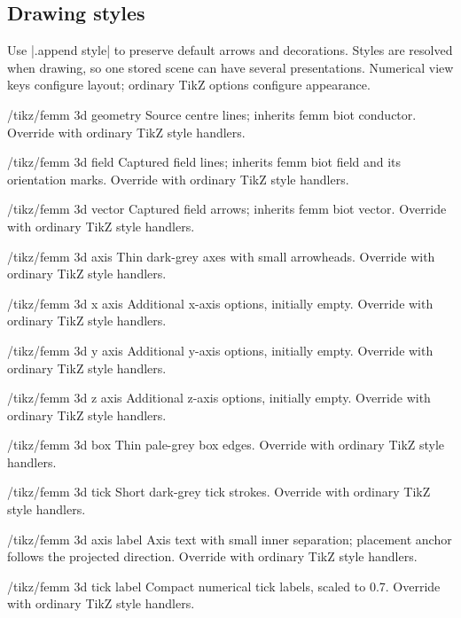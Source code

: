 \subsection{Drawing styles}
Use |.append style| to preserve default arrows and decorations. Styles are
resolved when drawing, so one stored scene can have several presentations.
Numerical view keys configure layout; ordinary TikZ options configure appearance.
\begin{key}{/tikz/femm 3d geometry}
Source centre lines; inherits femm biot conductor. Override with ordinary TikZ style handlers.
\end{key}
\begin{key}{/tikz/femm 3d field}
Captured field lines; inherits femm biot field and its orientation marks. Override with ordinary TikZ style handlers.
\end{key}
\begin{key}{/tikz/femm 3d vector}
Captured field arrows; inherits femm biot vector. Override with ordinary TikZ style handlers.
\end{key}
\begin{key}{/tikz/femm 3d axis}
Thin dark-grey axes with small arrowheads. Override with ordinary TikZ style handlers.
\end{key}
\begin{key}{/tikz/femm 3d x axis}
Additional x-axis options, initially empty. Override with ordinary TikZ style handlers.
\end{key}
\begin{key}{/tikz/femm 3d y axis}
Additional y-axis options, initially empty. Override with ordinary TikZ style handlers.
\end{key}
\begin{key}{/tikz/femm 3d z axis}
Additional z-axis options, initially empty. Override with ordinary TikZ style handlers.
\end{key}
\begin{key}{/tikz/femm 3d box}
Thin pale-grey box edges. Override with ordinary TikZ style handlers.
\end{key}
\begin{key}{/tikz/femm 3d tick}
Short dark-grey tick strokes. Override with ordinary TikZ style handlers.
\end{key}
\begin{key}{/tikz/femm 3d axis label}
Axis text with small inner separation; placement anchor follows the projected direction. Override with ordinary TikZ style handlers.
\end{key}
\begin{key}{/tikz/femm 3d tick label}
Compact numerical tick labels, scaled to 0.7. Override with ordinary TikZ style handlers.
\end{key}
